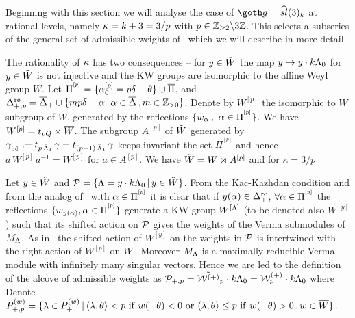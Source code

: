 Beginning with this section 
we will analyse the case of $\go=\widehat{sl}(3)_k$ at rational
levels, namely 
$\kappa=k+3=3/p$ with $p\in\Bbb Z_{\ge 2}\backslash 3\Bbb Z$. 
This selects a subseries of the general set of admissible weights
of \KW\  which we will describe in more detail.

The rationality of $\kappa$ has two consequences -- for $y\in \tilde W$
the map $y\mapsto y\cdot k\Lambda_0$ for $y\in \tilde W$ is not injective
and the KW groups are isomorphic to the affine Weyl group $W$.
Let $\Pi^{^{[p]}}=\{\alpha_0^{[p]}=p\delta-\theta \}\cup\overline\Pi$, and
$\Delta^{\rm re}_{+,p}= \overline\Delta_+\cup\{mp \delta+\alpha\,, \alpha\in
\overline\Delta\,, m\in \Bbb Z_{>0}\}$. Denote by $W^{[p]}$ the isomorphic to
$W$ subgroup of $W$, generated by the reflections $\{w_{\alpha}\,, \
\alpha\in\Pi^{^{[p]}}\}$.  We have $W^{[p]}=t_{pQ} \rtimes \overline W$.
The subgroup $A^{[p]}$ of $\tilde W$ generated by $
\gamma_{_{[p]}}:=t_{p\,\bar{\Lambda}_1}\,\bar{\gamma}=t_{(p-1)\,\bar{\Lambda}_1}\,\gamma$
keeps invariant the set $\Pi^{^{[p]}}$ and hence $a \, W^{[p]} \,
a^{-1} = W^{[p]}$ for $a\in  A^{[p]}$.  We have $\tilde W=W\rtimes
A^{[p]}$ and for $\kappa=3/p$
%
\eqn{}
%

Let $y\in\tilde W$ and ${\cal P}=\{\Lambda=y\cdot k\Lambda_0 \,|\, y\in\tilde W\}$.
{}From the Kac-Kazhdan condition and from the analog of \Ia\ with
$\alpha\in \Pi^{^{[p]}}$ it is clear that if $y(\alpha)\in\Delta^{\rm re}_+$,
$\forall\alpha\in\Pi^{^{[p]}}$ the reflections $\{w_{y(\alpha)},
\alpha\in\Pi^{^{[p]}}\}$ generate a KW group $W^{[\Lambda]}$ (to be
denoted also $W^{[y]}$) such that its shifted action on ${\cal P}$
 gives the weights of the Verma submodules of $M_\Lambda$.
As in \Ia\ the shifted action of $W^{[y]}$ on the weights in ${\cal P}$
is intertwined  with the right action of $W^{[p]}$ on $\tilde W$.
Moreover $M_\Lambda$ is a maximally reducible Verma module
with infinitely many singular vectors. Hence
we are led to the definition of 
the alcove
of admissible weights  as  ${\cal P}_{+,p} = \tilde{{\cal W}^{(+)}}_p\cdot k\Lambda_0
={\cal W}^{(+)}_p\cdot k\Lambda_0 $ where
%
\eqn{} 
Denote 
$ 
P_{+,p}^{(w)}=\{\lambda\in P_+^{(w)}
\,|\, \langle \lambda, \theta\rangle < p \ {\rm if}\  w(-\theta)<0 \ {\rm
or}\  \langle \lambda, \theta\rangle \le p\ {\rm if}\ w(-\theta)>0\,, w\in
\overline W \} \,.
$

